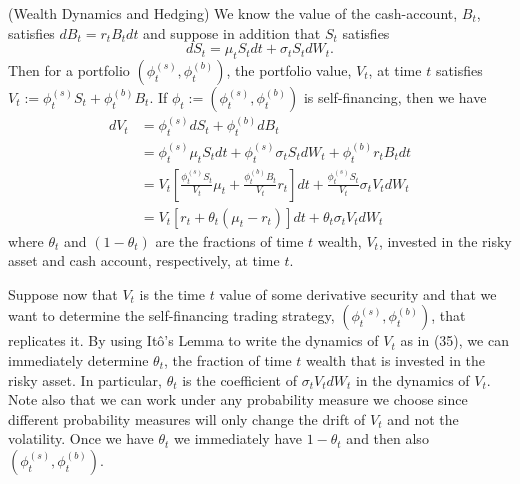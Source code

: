 \begin{example} (Wealth Dynamics and Hedging)
We know the value of the cash-account, $B_t$, satisfies $dB_t=r_t B_t dt$ and suppose in addition that $S_t$ satisfies
\[dS_t = \mu_t S_t dt + \sigma_t S_t dW_t. \tag{35}\]
Then for a portfolio $(\phi_t^{(s)},\phi_t^{(b)})$, the portfolio value, $V_t$, at time $t$ satisfies $V_t:=\phi_t^{(s)} S_t+\phi_t^{(b)} B_t$. If $\phi_t:=(\phi_t^{(s)},\phi_t^{(b)})$ is self-financing, then we have
\begin{align*}
dV_t &= \phi_t^{(s)} dS_t + \phi_t^{(b)} dB_t \\
&= \phi_t^{(s)} \mu_t S_t dt + \phi_t^{(s)} \sigma_t S_t dW_t + \phi_t^{(b)} r_t B_t dt \\
&= V_t \left[\frac{\phi_t^{(s)} S_t}{V_t} \mu_t + \frac{\phi_t^{(b)} B_t}{V_t} r_t\right] dt + \frac{\phi_t^{(s)} S_t}{V_t} \sigma_t V_t dW_t \\
&= V_t \left[r_t + \theta_t (\mu_t - r_t)\right] dt + \theta_t \sigma_t V_t dW_t
\end{align*}
where $\theta_t$ and $(1-\theta_t)$ are the fractions of time $t$ wealth, $V_t$, invested in the risky asset and cash account, respectively, at time $t$.

Suppose now that $V_t$ is the time $t$ value of some derivative security and that we want to determine the self-financing trading strategy, $(\phi_t^{(s)},\phi_t^{(b)})$, that replicates it. By using It\^o's Lemma to write the dynamics of $V_t$ as in (35), we can immediately determine $\theta_t$, the fraction of time $t$ wealth that is invested in the risky asset. In particular, $\theta_t$ is the coefficient of $\sigma_t V_t dW_t$ in the dynamics of $V_t$. Note also that we can work under any probability measure we choose since different probability measures will only change the drift of $V_t$ and not the volatility. Once we have $\theta_t$ we immediately have $1-\theta_t$ and then also $(\phi_t^{(s)},\phi_t^{(b)})$.
\end{example}

